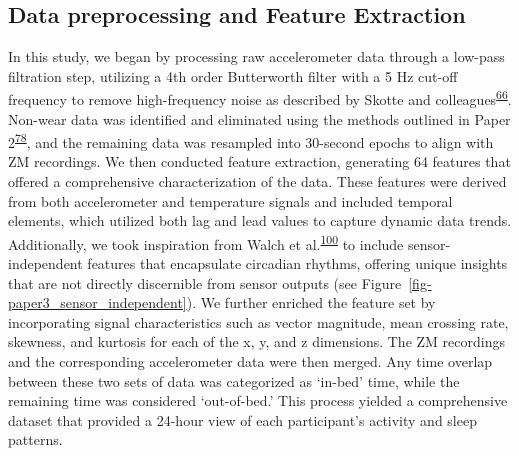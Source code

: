 \documentclass[
  9pt,
]{scrbook}
\begin{document}
\hypertarget{data-preprocessing-and-feature-extraction}{%
\subsection{Data preprocessing and Feature
Extraction}\label{data-preprocessing-and-feature-extraction}}

In this study, we began by processing raw accelerometer data through a
low-pass filtration step, utilizing a 4th order Butterworth filter with
a 5 Hz cut-off frequency to remove high-frequency noise as described by
Skotte and
colleagues\textsuperscript{\protect\hyperlink{ref-skotte_detection_2014}{66}}.
Non-wear data was identified and eliminated using the methods outlined
in Paper
2\textsuperscript{\protect\hyperlink{ref-skovgaard_generalizability_2023}{78}},
and the remaining data was resampled into 30-second epochs to align with
ZM recordings. We then conducted feature extraction, generating 64
features that offered a comprehensive characterization of the data.
These features were derived from both accelerometer and temperature
signals and included temporal elements, which utilized both lag and lead
values to capture dynamic data trends. Additionally, we took inspiration
from Walch et
al.\textsuperscript{\protect\hyperlink{ref-walch_sleep_2019}{100}} to
include sensor-independent features that encapsulate circadian rhythms,
offering unique insights that are not directly discernible from sensor
outputs (see Figure~\ref{fig-paper3_sensor_independent}). We further
enriched the feature set by incorporating signal characteristics such as
vector magnitude, mean crossing rate, skewness, and kurtosis for each of
the x, y, and z dimensions. The ZM recordings and the corresponding
accelerometer data were then merged. Any time overlap between these two
sets of data was categorized as `in-bed' time, while the remaining time
was considered `out-of-bed.' This process yielded a comprehensive
dataset that provided a 24-hour view of each participant's activity and
sleep patterns.
\end{document}
